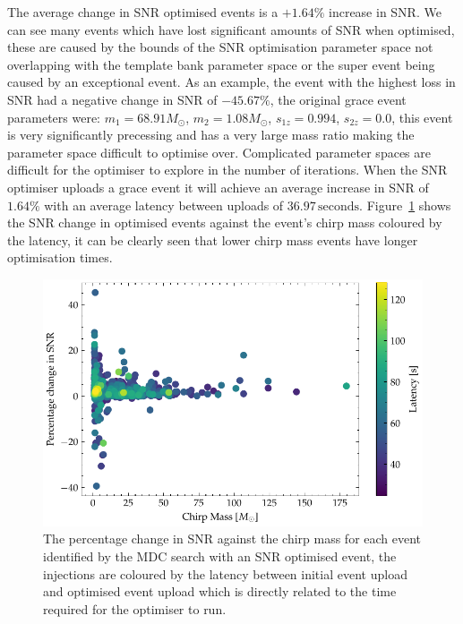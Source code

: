 %
The average change in SNR optimised events is a $+1.64\%$ increase in SNR. We can see many events which have lost significant amounts of SNR when optimised, these are caused by the bounds of the SNR optimisation parameter space not overlapping with the template bank parameter space or the super event being caused by an exceptional event. As an example, the event with the highest loss in SNR had a negative change in SNR of $-45.67\%$, the original grace event parameters were: $m_{1} = 68.91 M_{\odot}$, $m_{2} = 1.08 M_{\odot}$, $s_{1z} = 0.994$, $s_{2z} = 0.0$, this event is very significantly precessing and has a very large mass ratio making the parameter space difficult to optimise over. Complicated parameter spaces are difficult for the optimiser to explore in the number of iterations. When the SNR optimiser uploads a grace event it will achieve an average increase in SNR of $1.64\%$ with an average latency between uploads of $36.97 \, \text{seconds}$. Figure~\ref{7:fig:mchirp_latency_diff} shows the SNR change in optimised events against the event's chirp mass coloured by the latency, it can be clearly seen that lower chirp mass events have longer optimisation times.
%
\begin{figure}
    \centering
    \includegraphics[width=1.0\linewidth]{images/7_snr_optimiser/mchirp_snr_diff.pdf}
    \caption{The percentage change in SNR against the chirp mass for each \gwadj event identified by the MDC search with an SNR optimised event, the injections are coloured by the latency between initial event upload and optimised event upload which is directly related to the time required for the optimiser to run.}
    \label{7:fig:mchirp_latency_diff}
\end{figure}
%

